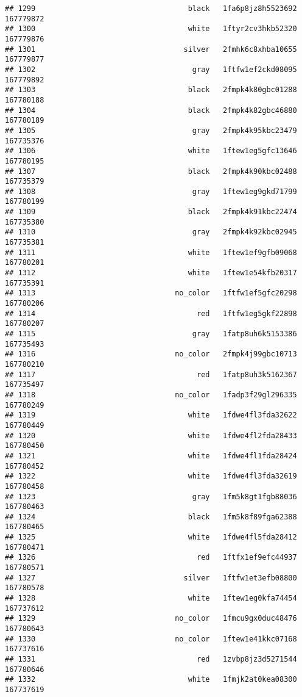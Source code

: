 \documentclass[
]{article}
\begin{document}
\begin{verbatim}
## 1299                                   black   1fa6p8jz8h5523692 167779872
## 1300                                   white   1ftyr2cv3hkb52320 167779876
## 1301                                  silver   2fmhk6c8xhba10655 167779877
## 1302                                    gray   1ftfw1ef2ckd08095 167779892
## 1303                                   black   2fmpk4k80gbc01288 167780188
## 1304                                   black   2fmpk4k82gbc46880 167780189
## 1305                                    gray   2fmpk4k95kbc23479 167735376
## 1306                                   white   1ftew1eg5gfc13646 167780195
## 1307                                   black   2fmpk4k90kbc02488 167735379
## 1308                                    gray   1ftew1eg9gkd71799 167780199
## 1309                                   black   2fmpk4k91kbc22474 167735380
## 1310                                    gray   2fmpk4k92kbc02945 167735381
## 1311                                   white   1ftew1ef9gfb09068 167780201
## 1312                                   white   1ftew1e54kfb20317 167735391
## 1313                                no_color   1ftfw1ef5gfc20298 167780206
## 1314                                     red   1ftfw1eg5gkf22898 167780207
## 1315                                    gray   1fatp8uh6k5153386 167735493
## 1316                                no_color   2fmpk4j99gbc10713 167780210
## 1317                                     red   1fatp8uh3k5162367 167735497
## 1318                                no_color   1fadp3f29gl296335 167780249
## 1319                                   white   1fdwe4fl3fda32622 167780449
## 1320                                   white   1fdwe4fl2fda28433 167780450
## 1321                                   white   1fdwe4fl1fda28424 167780452
## 1322                                   white   1fdwe4fl3fda32619 167780458
## 1323                                    gray   1fm5k8gt1fgb88036 167780463
## 1324                                   black   1fm5k8f89fga62388 167780465
## 1325                                   white   1fdwe4fl5fda28412 167780471
## 1326                                     red   1ftfx1ef9efc44937 167780571
## 1327                                  silver   1ftfw1et3efb08800 167780578
## 1328                                   white   1ftew1eg0kfa74454 167737612
## 1329                                no_color   1fmcu9gx0duc48476 167780643
## 1330                                no_color   1ftew1e41kkc07168 167737616
## 1331                                     red   1zvbp8jz3d5271544 167780646
## 1332                                   white   1fmjk2at0kea08300 167737619

\end{verbatim}
\end{document}
